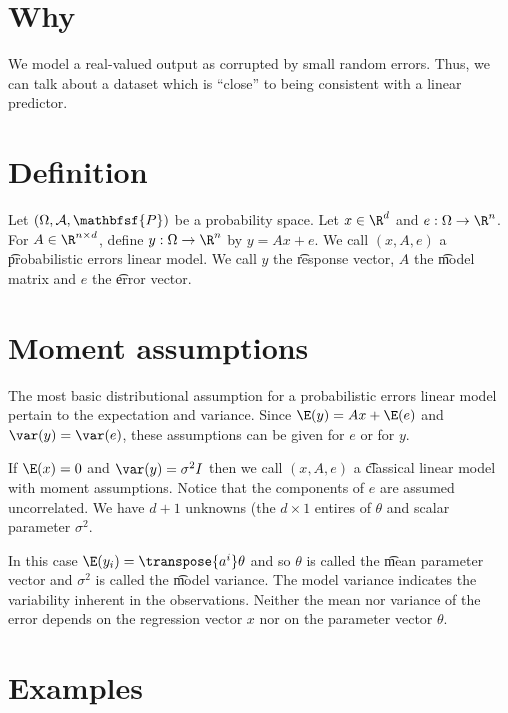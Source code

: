 

\section*{Why}

We model a real-valued output as corrupted by small random errors.
Thus, we can talk about a dataset which is ``close'' to being consistent with a linear predictor.

\section*{Definition}

Let $(\Omega , \mathcal{A} , \mathbfsf{P} )$ be a probability space.
Let $x \in \R ^d$ and $e: \Omega  \to \R ^n$.
For $A \in \R ^{n \times d}$, define $y: \Omega  \to \R ^n$ by $y = Ax + e$.
We call $(x, A, e)$ a \t{probabilistic errors linear model}.
We call $y$ the \t{response vector}, $A$ the \t{model matrix} and $e$ the \t{error vector}.

\section*{Moment assumptions}

The most basic distributional assumption for a probabilistic errors linear model pertain to the expectation and variance.
Since $\E (y) = Ax + \E (e)$ and $\var(y) = \var(e)$, these assumptions can be given for $e$ or for $y$.

If $\E (x) = 0$ and $\var(y) = \sigma ^2I$ then we call $(x, A, e)$ a \t{classical linear model with moment assumptions}.
Notice that the components of $e$ are assumed uncorrelated.
We have $d + 1$ unknowns (the $d \times 1$ entires of $\theta $ and scalar parameter $\sigma ^2$.

In this case $\E (y_i) = \transpose{a^i}\theta $ and so $\theta $ is called the \t{mean parameter vector} and $\sigma ^2$ is called the \t{model variance}.
The model variance indicates the variability inherent in the observations.
Neither the mean nor variance of the error depends on the regression vector $x$ nor on the parameter vector $\theta $.

\section*{Examples}


